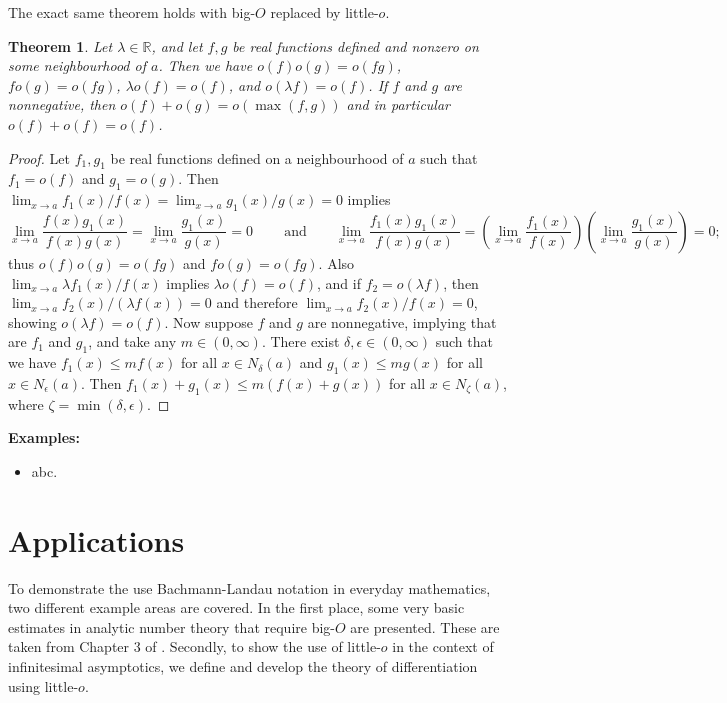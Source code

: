 \documentclass{article}
\newtheorem{theorem}{Theorem}
\theoremstyle{definition}
\newcommand\RR{\mathbb R}
\begin{document}
The exact same theorem holds with big-$O$ replaced by little-$o$.

\begin{theorem}
    Let \(\lambda\in\RR\), and let \(f,g\) be real functions defined and nonzero on some neighbourhood of \(a\).
    Then we have \(o(f)o(g) = o(fg)\), \(fo(g) = o(fg)\), \(\lambda o(f) = o(f)\), and \(o(\lambda f) = o(f)\).
    If \(f\) and \(g\) are nonnegative, then \(o(f) + o(g) = o(\max(f, g))\) and in particular \(o(f) + o(f) = o(f)\).
\end{theorem}

\begin{proof}
    Let \(f_1,g_1\) be real functions defined on a neighbourhood of \(a\) such that \(f_1 = o(f)\) and \(g_1 = o(g)\).
    Then \(\lim_{x\to a} f_1(x)/f(x) = \lim_{x\to a} g_1(x)/g(x) = 0\) implies
    \[\lim_{x\to a} \frac{f(x)g_1(x)}{f(x)g(x)} = \lim_{x\to a} \frac{g_1(x)}{g(x)} = 0\ \qquad \text{and} \qquad \lim_{x\to a} \frac{f_1(x)g_1(x)}{f(x)g(x)} = \left(\lim_{x\to a} \frac{f_1(x)}{f(x)}\right) \left(\lim_{x\to a} \frac{g_1(x)}{g(x)}\right) = 0;\]
    thus \(o(f)o(g)=o(fg)\) and \(fo(g)=o(fg)\).
    Also \(\lim_{x\to a} \lambda f_1(x)/f(x)\) implies \(\lambda o(f) = o(f)\), and if \(f_2 = o(\lambda f)\), then \(\lim_{x\to a} f_2(x)/(\lambda f(x)) = 0\) and therefore \(\lim_{x\to a} f_2(x)/f(x) = 0\), showing \(o(\lambda f) = o(f)\).
    Now suppose \(f\) and \(g\) are nonnegative, implying that are \(f_1\) and \(g_1\), and take any \(m\in(0,\infty)\).
    There exist \(\delta,\epsilon\in(0,\infty)\) such that we have \(f_1(x) \le mf(x)\) for all \(x\in N_{\delta}(a)\) and \(g_1(x) \le mg(x)\) for all \(x\in N_{\epsilon}(a)\).
    Then \(f_1(x) + g_1(x) \le m(f(x) + g(x))\) for all \(x\in N_{\zeta}(a)\), where \(\zeta = \min(\delta,\epsilon)\).
\end{proof}

\textbf{Examples:}

\begin{itemize}
    \item abc.
\end{itemize}

\section{Applications}\label{sec:applications}

To demonstrate the use Bachmann-Landau notation in everyday mathematics, two different example areas are covered.
In the first place, some very basic estimates in analytic number theory that require big-$O$ are presented.
These are taken from Chapter 3 of \cite{Apostol1976}.
Secondly, to show the use of little-$o$ in the context of infinitesimal asymptotics, we define and develop the theory of differentiation using little-$o$.
\end{document}
